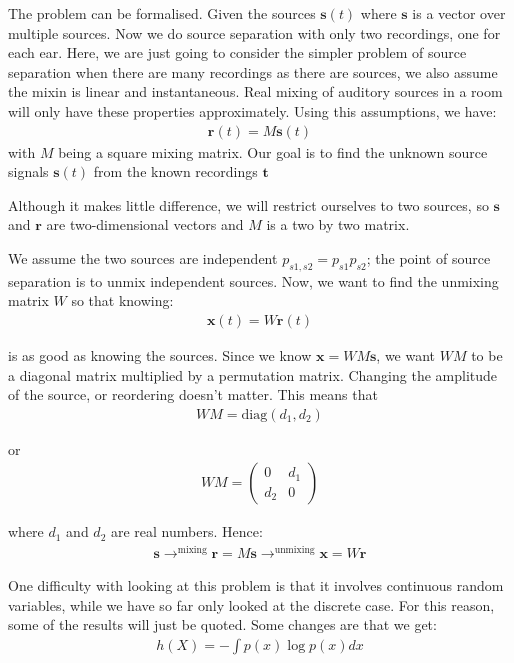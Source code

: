 \documentclass[11pt,a4paper,titlepage,dvipsnames,cmyk]{scrartcl}
\begin{document}
The problem can be formalised. Given the sources $\mathbf{s}(t)$ where $\mathbf{s}$ is a vector over multiple sources. Now we do source separation with only two recordings, one for each ear. Here, we are just going to consider the simpler problem of source separation when there are many recordings as there are sources, we also assume the mixin is linear and instantaneous. Real mixing of auditory sources in a room will only have these properties approximately. Using this assumptions, we have:
\begin{align*}
\mathbf{r}(t) = M\mathbf{s}(t)
\end{align*}
with $M$ being a square mixing matrix. Our goal is to find the unknown source signals $\mathbf{s}(t)$ from the known recordings $\mathbf{t}$

Although it makes little difference, we will restrict ourselves to two sources, so $\mathbf{s}$ and $\mathbf{r}$ are two-dimensional vectors and $M$ is a two by two matrix.

We assume the two sources are independent $p_{s1,s2} = p_{s1}p_{s2}$; the point of source separation is to unmix independent sources. Now, we want to find the unmixing matrix $W$ so that knowing:
\begin{align*}
\mathbf{x}(t) = W\mathbf{r}(t)
\end{align*}

is as good as knowing the sources. Since we know $\mathbf{x} = WM\mathbf{s}$, we want $WM$ to be a diagonal matrix multiplied by a permutation matrix. Changing the amplitude of the source, or reordering doesn't matter. This means that
\begin{align*}
WM = \text{diag}(d_1,d_2)
\end{align*}

or
\begin{align*}
WM= \begin{pmatrix}
    0 & d_1 \\
    d_2 & 0
\end{pmatrix}
\end{align*}

where $d_1$ and $d_2$ are real numbers. Hence:
\begin{align*}
\mathbf{s} \rightarrow^\text{mixing} \mathbf{r} = M\mathbf{s} \rightarrow^\text{unmixing} \mathbf{x} = W \mathbf{r}
\end{align*}


One difficulty with looking at this problem is that it involves continuous random variables, while we have so far only looked at the discrete case. For this reason, some of the results will just be quoted. Some changes are that we get:
\begin{align*}
h(X) = -\int p(x) \log p(x) dx
\end{align*}
\end{document}
